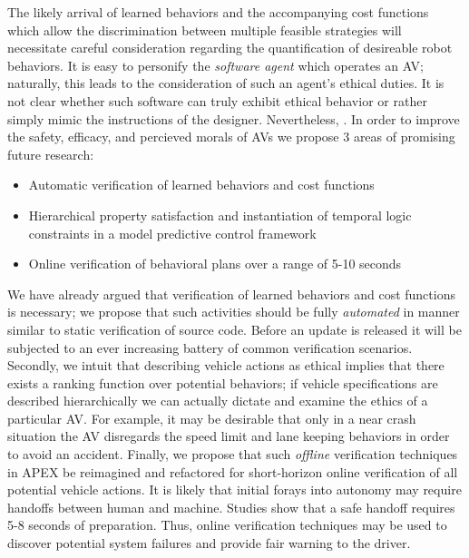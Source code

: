  The likely arrival of learned behaviors and the accompanying cost functions which allow the discrimination between multiple feasible strategies will necessitate careful consideration regarding the quantification of desireable robot behaviors. It is easy to personify the \emph{software agent} which operates an AV; naturally, this leads to the consideration of such an agent's ethical duties. It is not clear whether such software can truly exhibit ethical behavior or rather simply mimic the instructions of the designer. Nevertheless,  \cite{maurer2015autonomes}. In order to improve the safety, efficacy, and percieved morals of AVs we propose 3 areas of promising future research: 
 \begin{itemize}
 	\item Automatic verification of learned behaviors and cost functions
 	\item Hierarchical property satisfaction and instantiation of temporal logic constraints in a model predictive control framework
 	\item Online verification of behavioral plans \cite{wei2014behavioral} over a range of 5-10 seconds
 \end{itemize}
 
 We have already argued that verification of learned behaviors and cost functions is necessary; we propose that such activities should be fully \emph{automated} in manner similar to static verification of source code. Before an update is released it will be subjected to an ever increasing battery of common verification scenarios. Secondly, we intuit that describing vehicle actions as ethical implies that there exists a ranking function over potential behaviors; if vehicle specifications are described hierarchically we can actually dictate and examine the ethics of a particular AV. For example, it may be desirable that only in a near crash situation the AV disregards the speed limit and lane keeping behaviors in order to avoid an accident. Finally, we propose that such \emph{offline} verification techniques in APEX be reimagined and refactored for short-horizon online verification of all potential vehicle actions. It is likely that initial forays into autonomy may require handoffs between human and machine. Studies show \cite{blanco2013human} that a safe handoff requires 5-8 seconds of preparation. Thus, online verification techniques may be used to discover potential system failures and provide fair warning to the driver. 